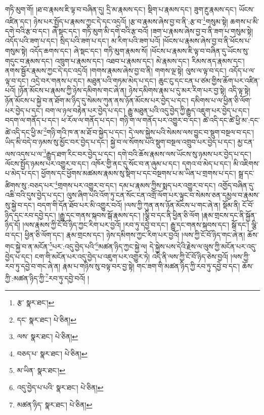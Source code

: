 གཏི་མུག་གོ། །ཐ་བ་རྣམས་ཇི་ལྟ་བ་བཞིན་དུ། དྲི་མ་རྣམས་དང་། སྡིག་པ་རྣམས་དང་། ཟུག་རྔུ་རྣམས་དང་། ཡོངས་འཛིན་དང་། ཉེས་པར་སྤྱོད་པ་རྣམས་ཀྱང་དེ་དང་འདྲའོ། །རྩ་བ་རྣམས་ཞེས་བྱ་བ་ནི་:རྩ་བ་\footnote{རྩ་  སྣར་ཐང་། }གསུམ་སྟེ། ཆགས་པ་མི་དགེ་བའི་རྩ་བ་དང་། ཞེ་སྡང་དང་། གཏི་མུག་མི་དགེ་བའི་རྩ་བའོ། །ཟག་པ་རྣམས་ཞེས་བྱ་བ་ནི་ཟག་པ་གསུམ་སྟེ། འདོད་པའི་ཟག་པ་དང་། སྲིད་པའི་ཟག་པ་དང་། མ་རིག་པའི་ཟག་པའོ། །ཕོངས་པ་རྣམས་ཞེས་བྱ་བ་ནི་ཕོངས་པ་གསུམ་སྟེ། འདོད་ཆགས་དང་། ཞེ་སྡང་དང་། གཏི་མུག་རྣམས་སོ། །ཕོངས་པ་རྣམས་ཇི་ལྟ་བ་བཞིན་དུ་ཡོངས་སུ་གདུང་བ་རྣམས་དང་། འཁྲུག་པ་རྣམས་དང་། འཐབ་པ་རྣམས་དང་། མེ་རྣམས་དང་། རིམས་ནད་རྣམས་དང་། ནགས་སྦྱོར་རྣམས་ཀྱང་དེ་དང་འདྲའོ། །གགས་རྣམས་ཞེས་བྱ་བ་ནི། གགས་ལྔ་སྟེ། ལུས་ལ་ལྟ་བ་དང་། འདོད་པ་ལ་ལྟ་བ་དང་། འདྲེ་བར་གནས་པ་དང་། མཐུན་པའི་གཏམ་མེད་པ་དང་། ཆུང་ངུ་དང་ངན་པ་ཙམ་གྱིས་ཆོག་པར་འཛིན་པའོ། །ཉོན་མོངས་པ་རྣམས་ཀྱི་ཉེས་དམིགས་གང་ཞེ་ན། ཉེས་དམིགས་རྣམ་པ་དུ་མར་རིག་པར་བྱ་སྟེ། འདི་ལྟ་སྟེ། ཉོན་མོངས་པ་སྐྱེ་བ་ན་ཐོག་མ་ཉིད་དུ་སེམས་ཀུན་ནས་ཉོན་མོངས་པར་བྱེད་པ་དང་། དམིགས་པ་ལ་ཕྱིན་ཅི་ལོག་པར་བྱེད་པ་དང་། བག་ལ་ཉལ་བརྟེན་པར་བྱེད་པ་དང་། རྒྱུ་མཐུན་པའི་འདུ་བྱེད་ཀྱི་རྒྱུད་འཇུག་པར་བྱེད་པ་དང་། བདག་ལ་གནོད་པ་དང་། ཕ་རོལ་ལ་གནོད་པ་དང་། གཉི་ག་ལ་གནོད་པར་འགྱུར་བ་དང་། ཚེ་འདི་དང་ཚེ་ཕྱི་མ་:དང་ཚེ་འདི་དང་ཕྱི་མ་\footnote{དང་  སྣར་ཐང་།  པེ་ཅིན། }གཉི་གའི་ཁ་ན་མ་ཐོ་བ་སྐྱེད་པ་དང་། དེ་ལས་སྐྱེས་པའི་སེམས་ལས་བྱུང་བ་སྡུག་བསྔལ་བ་དང་། ཡིད་མི་བདེ་བ་ཉམས་སུ་མྱོང་བར་བྱེད་པ་དང་། སྐྱེ་བ་ལ་སོགས་པའི་སྡུག་བསྔལ་འགྲུབ་པར་བྱེད་པ་དང་། མྱ་ངན་ལས་འདས་པ་ལ་\footnote{ལས་  སྣར་ཐང་།  པེ་ཅིན། }རྒྱུད་ཐག་རིང་བར་བྱེད་པ་དང་། དགེ་བའི་ཆོས་རྣམས་ལས་ཡོངས་སུ་ཉམས་པར་བྱེད་པ་དང་། ལོངས་སྤྱོད་ཉམས་པར་འགྱུར་བ་དང་། འཁོར་གྱི་ནང་དུ་སོང་བ་ན་ཞུམ་པ་དང་། དགའ་བ་མེད་པ་དང་། མི་འཇིགས་པ་མེད་པ་དང་། ཕྱོགས་དང་ཕྱོགས་མཚམས་རྣམས་སུ་སྡིག་པ་དང་བསྔགས་པ་མ་ཡིན་པ་གྲགས་པ་དང་། སྒྲ་དང་ཚིགས་སུ་:བཅད་པར་\footnote{བཅད་པ་  སྣར་ཐང་།  པེ་ཅིན། }གྲགས་པར་འགྱུར་བ་དང་། དམ་པ་རྣམས་ཀྱིས་སྨད་པར་འགྱུར་བ་དང་། འགྱོད་བཞིན་དུ་འཆི་བའི་དུས་བྱེད་པ་དང་། ལུས་ཞིག་པའི་འོག་ཏུ་ངན་སོང་ངན་འགྲོ་ལོག་པར་ལྟུང་བ་སེམས་ཅན་དམྱལ་བ་རྣམས་སུ་སྐྱེ་བ་དང་། བདག་གི་དོན་ཐོབ་པར་མི་འགྱུར་བའོ། །ལས་ཀྱི་ཀུན་ནས་ཉོན་མོངས་པ་གང་ཞེ་ན། སྡོམ་ནི། ངོ་བོ་ཉིད་དང་རབ་དབྱེ་དང་། །རྒྱུ་དང་གནས་སྐབས་སྒོ་རྣམས་དང་། །ལྕི་བ་དང་ནི་ཕྱིན་ཅི་ལོག །རྣམ་གྲངས་དང་ནི་སྐྱོན་ཉིད་དོ། །ལས་རྣམས་ཀྱི་ངོ་བོ་ཉིད་ཀྱང་རིག་པར་བྱའོ། །རབ་ཏུ་དབྱེ་བ་དང་། རྒྱུ་དང་གནས་སྐབས་དང་། སྒོ་དང་། ལྕི་བ་དང་། ཕྱིན་ཅི་ལོག་དང་། རྣམ་གྲངས་དང་། ཉེས་དམིགས་ཀྱང་རིག་པར་བྱའོ། །ལས་ཀྱི་ངོ་བོ་ཉིད་གང་ཞེ་ན། ཆོས་གང་སྐྱེ་བ་ན་མངོན་\footnote{མ་ཡིན་  སྣར་ཐང་། }པར་:འདུ་བྱེད་པའི་\footnote{འདུ་བྱེད་པ་པའི་  སྣར་ཐང་།  པེ་ཅིན། }མཚན་ཉིད་ཀྱང་སྐྱེ་ལ། དེ་སྐྱེས་པས་དེའི་རྗེས་ལ་ལུས་ཀྱི་མངོན་པར་འདུ་བྱེད་པ་དང་། ངག་གི་མངོན་པར་འདུ་བྱེད་པ་འཇུག་པར་འགྱུར་ཏེ། འདི་ནི་ལས་ཀྱི་ངོ་བོ་ཉིད་ཅེས་བྱའོ། །ལས་ཀྱི་རབ་ཏུ་དབྱེ་བ་གང་ཞེ་ན། རྣམ་པ་གཉིས་སུ་བལྟ་བར་བྱ་སྟེ། གང་ཟག་གི་མཚན་ཉིད་ཀྱི་རབ་ཏུ་དབྱེ་བ་དང་། ཆོས་ཀྱི་:མཚན་ཉིད་ཀྱི་\footnote{མཚན་ཉིད་  སྣར་ཐང་།  པེ་ཅིན། }རབ་ཏུ་དབྱེ་བའོ། །
